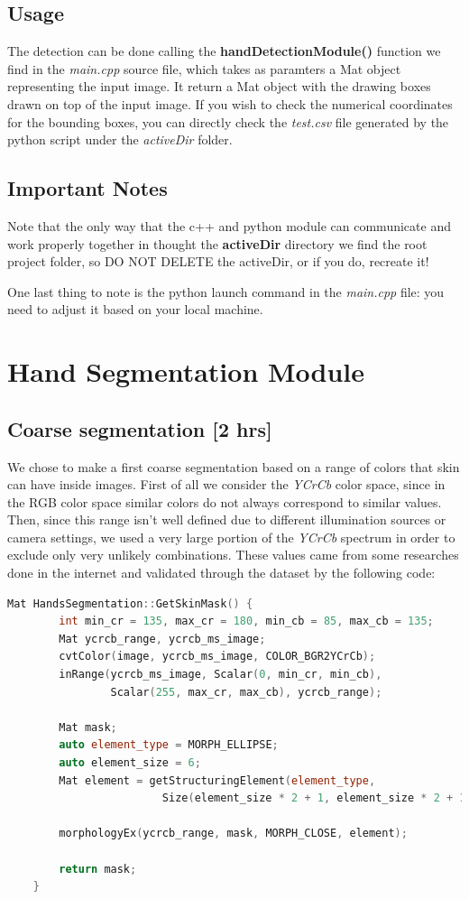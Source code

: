 \subsection{Usage}
The detection can be done calling the \textbf{handDetectionModule()} function we find in the \textit{main.cpp} source file, which takes as paramters a Mat object representing 
the input image. It return a Mat object with the drawing boxes drawn on top of the input image. If you wish to check the numerical coordinates for the bounding boxes, 
you can directly check the \textit{test.csv} file generated by the python script under the \textit{activeDir} folder.

\subsection{Important Notes}
Note that the only way that the c++ and python module can communicate and work properly together in thought the \textbf{activeDir} directory we find 
the root project folder, so DO NOT DELETE the activeDir, or if you do, recreate it! 

One last thing to note is the python launch command in the \textit{main.cpp} file: you need to adjust it based on your local machine.

\section{Hand Segmentation Module}

\subsection{Coarse segmentation [2 hrs]}
We chose to make a first coarse segmentation based on a range of colors that
skin can have inside images. First of all we consider the \textit{YCrCb} color
space, since in the RGB color space similar colors do not always correspond to
similar values. Then, since this range isn't well defined due to
different illumination sources or camera settings, we used a very large portion
of the \textit{YCrCb} spectrum in order to exclude only very unlikely
combinations. These values came from some researches done in the internet and
validated through the dataset by the following code:

\begin{lstlisting}[language = c++]
    Mat HandsSegmentation::GetSkinMask() {
        int min_cr = 135, max_cr = 180, min_cb = 85, max_cb = 135;
        Mat ycrcb_range, ycrcb_ms_image;
        cvtColor(image, ycrcb_ms_image, COLOR_BGR2YCrCb);
        inRange(ycrcb_ms_image, Scalar(0, min_cr, min_cb), 
                Scalar(255, max_cr, max_cb), ycrcb_range);
    
        Mat mask;
        auto element_type = MORPH_ELLIPSE;
        auto element_size = 6;
        Mat element = getStructuringElement(element_type, 
                        Size(element_size * 2 + 1, element_size * 2 + 1));

        morphologyEx(ycrcb_range, mask, MORPH_CLOSE, element);
    
        return mask;
    }
\end{lstlisting}

